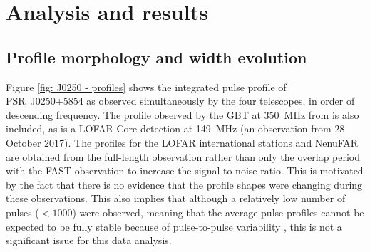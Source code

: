 \section{Analysis and results}
\label{sec: J0250 - analysis}

\subsection{Profile morphology and width evolution}
\label{sec: J0250 - analysis - profile widths}

Figure \ref{fig: J0250 - profiles} shows the integrated pulse profile of PSR~J0250+5854 as observed simultaneously by the four telescopes, in order of descending frequency. The profile observed by the GBT at 350~MHz from \citet{TBC+2018} is also included, as is a LOFAR Core detection at 149~MHz (an observation from 28 October 2017). The profiles for the LOFAR international stations and NenuFAR are obtained from the full-length observation rather than only the overlap period with the FAST observation to increase the signal-to-noise ratio. This is motivated by the fact that there is no evidence that the profile shapes were changing during these observations. This also implies that although a relatively low number of pulses ($<1000$) were observed, meaning that the average pulse profiles cannot be expected to be fully stable because of pulse-to-pulse variability \citep[e.g.][]{HMTx1975,RRxx1995,LKL+2012}, this is not a significant issue for this data analysis.

